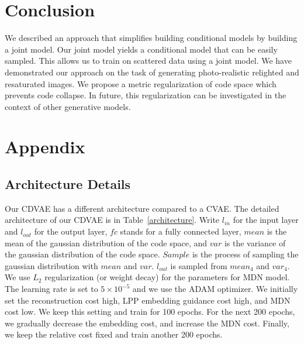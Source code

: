 \documentclass[10pt,twocolumn,letterpaper]{article}
\begin{document}
\section{Conclusion}
We described an approach that simplifies building conditional models by building a 
joint model. Our joint model yields a conditional model that can be easily sampled.  This allows us 
to train on scattered data using a joint model.  We have demonstrated our approach on the task
of generating photo-realistic relighted and resaturated images. We propose a metric regularization of code
space which prevents code collapse. In future, this regularization can be investigated in the 
context of other generative models. 


\clearpage

\section{Appendix}
\subsection{Architecture Details}
Our CDVAE has a different architecture compared to a CVAE. The detailed architecture of our CDVAE is in 
Table~\ref{architecture}. Write $l_{in}$ for the input layer and $l_{out}$ for the output layer, 
$fc$ stands for a fully connected layer, $mean$ is the mean of the gaussian distribution of the code 
space, and $var$ is the variance of the gaussian distribution of the code space. $Sample$ is 
the process of sampling the gaussian distribution with $mean$ and $var$. $l_{out}$ is sampled from 
$mean_4$ and $var_4$. We use $L_2$ regularization (or weight decay) for the parameters for MDN model. 
The learning rate is set to  $5 \times 10^{-5}$ and we use the ADAM optimizer. We initially set the 
reconstruction cost high, LPP embedding guidance cost high, and MDN cost low. We keep this setting 
and train for 100 epochs. For the next 200 epochs, we gradually decrease the embedding cost, and 
increase the MDN cost. Finally, we keep the relative cost fixed and train another 200 epochs. 
\end{document}
